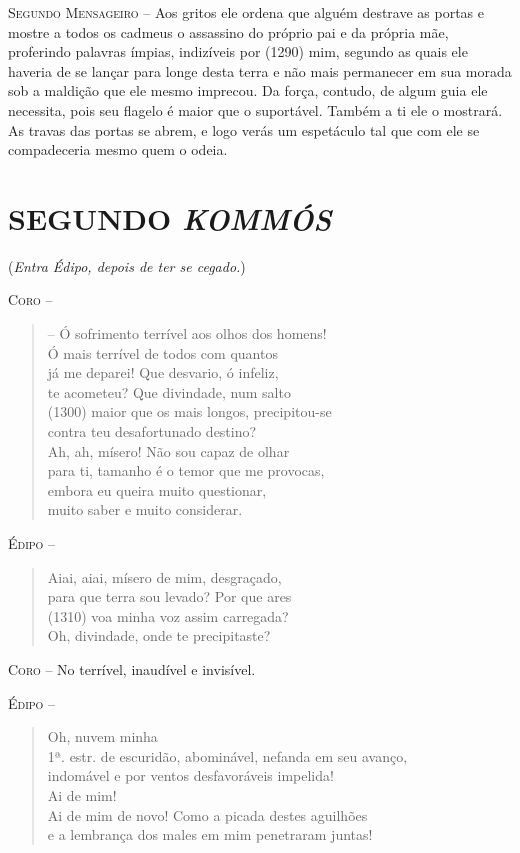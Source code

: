 \textsc{Segundo Mensageiro} --   Aos gritos ele ordena que alguém destrave as portas e mostre a todos os
cadmeus o assassino do próprio pai e da própria mãe, proferindo palavras
ímpias, indizíveis por (1290) mim, segundo as quais ele haveria de se
lançar para longe desta terra e não mais permanecer em sua morada sob a
maldição que ele mesmo imprecou. Da força, contudo, de algum guia ele
necessita, pois seu flagelo é maior que o suportável. Também a ti ele o
mostrará. As travas das portas se abrem, e logo verás um espetáculo tal
que com ele se compadeceria mesmo quem o odeia.


\section{SEGUNDO \emph{KOMMÓS}}

(\emph{Entra Édipo, depois de ter se cegado.})

\textsc{Coro} -- \begin{verse} -- Ó sofrimento terrível aos olhos dos homens!\\
Ó mais terrível de todos com quantos\\
já me deparei! Que desvario, ó infeliz,\\
te acometeu? Que divindade, num salto\\ (1300)
maior que os mais longos, precipitou-se\\
contra teu desafortunado destino?\\
Ah, ah, mísero! Não sou capaz de olhar\\
para ti, tamanho é o temor que me provocas,\\
embora eu queira muito questionar,\\
muito saber e muito considerar.
\end{verse}

\textsc{Édipo} -- \begin{verse}Aiai, aiai, mísero de mim, desgraçado,\\
para que terra sou levado? Por que ares\\ (1310)
voa minha voz assim carregada?\\
Oh, divindade, onde te precipitaste?
\end{verse}

\textsc{Coro} --   No terrível, inaudível e invisível.

\textsc{Édipo} -- \begin{verse}Oh, nuvem minha\\ 1ª. estr.
de escuridão, abominável, nefanda em seu avanço,\\
indomável e por ventos desfavoráveis impelida!\\
Ai de mim!\\
Ai de mim de novo! Como a picada destes aguilhões\\
e a lembrança dos males em mim penetraram juntas!
\end{verse}

